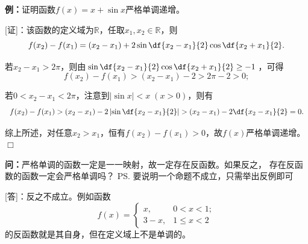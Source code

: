 {\b{\bf 例：}证明函数$f(x)=x+\sin x$严格单调递增。}

\begin{center}
\end{center}

[证]：该函数的定义域为$\mathbb{R}$，任取$x_1,x_2\in\mathbb{R}$，则
$$f(x_2)-f(x_1)=(x_2-x_1)+2\sin\df{x_2-x_1}{2}\cos\df{x_2+x_1}{2}.$$

若$x_2-x_1>2\pi$，则由$\sin\df{x_2-x_1}{2}\cos\df{x_2+x_1}{2}\geq -1$，可得
$$f(x_2)-f(x_1)>(x_2-x_1)-2>2\pi-2>0;$$

若$0<x_2-x_1<2\pi$，注意到$|\sin x|<x\;(x>0)$，则有
$$f(x_2)-f(x_1)>(x_2-x_1)-2\left|\sin\df{x_2-x_1}{2}\right|
>(x_2-x_1)-2\df{x_2-x_1}{2}=0.$$

综上所述，对任意$x_2>x_1$，恒有$f(x_2)-f(x_1)>0$，故$f(x)$严格单调递增。
\hfill $\Box$


{\b{\bf 问：}严格单调的函数一定是一一映射，故一定存在反函数。如果反之，
存在反函数的函数一定会严格单调吗？}
\ps{要说明一个命题不成立，只需举出反例即可}

[答]：反之不成立。例如函数
$$f(x)=\left\{\begin{array}{ll}
	x,&0<x<1;\\
	3-x,&1\leq x<2
\end{array}\right.$$
的反函数就是其自身，但在定义域上不是单调的。

